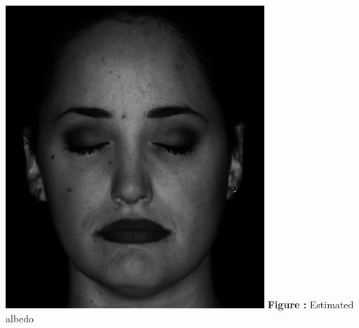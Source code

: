 \documentclass{article}
\begin{document}
	\begin{minipage}{0.48\linewidth}
	\centering
	\includegraphics[width=\linewidth]{./src/2b-a.png}
	\textbf{Figure \thefigure:} Estimated albedo  %
	\label{fig:Q2_b_a}         %
	\end{minipage}
\hfill
\end{document}

